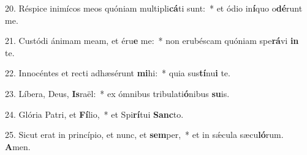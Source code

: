 20. Réspice inimícos meos quóniam multipli\textbf{cá}ti sunt:~*  et ódio in\textbf{í}quo o\textbf{dé}runt me.\

21. Custódi ánimam meam, et éru\textbf{e} me:~*  non erubéscam quóniam spe\textbf{rá}vi \textbf{in} te.\

22. Innocéntes et recti adhæsérunt \textbf{mi}hi:~*  quia sus\textbf{tí}nu\textbf{i} te.\

23. Líbera, Deus, \textbf{Is}raël:~*  ex ómnibus tribulati\textbf{ó}nibus \textbf{su}is.\

24. Glória Patri, et \textbf{Fí}lio,~*  et Spi\textbf{rí}tui \textbf{Sanc}to.\

25. Sicut erat in princípio, et nunc, et \textbf{sem}per,~*  et in sǽcula sæcu\textbf{ló}rum. \textbf{A}men.\


